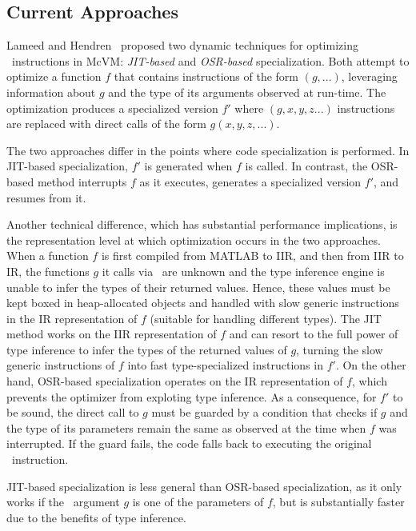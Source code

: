 
\subsection{Current Approaches}
\label{ss:prev-eval-sol}

Lameed and Hendren~\cite{lameed2013feval} proposed two dynamic techniques for optimizing \feval\ instructions in McVM: {\em JIT-based} and {\em OSR-based} specialization. Both attempt to optimize a function $f$ that contains instructions of the form \feval$(g,...)$, leveraging information about $g$ and the type of its arguments observed at run-time. The optimization produces a specialized version $f'$ where \feval$(g,x,y,z...)$ instructions are replaced with direct calls of the form $g(x,y,z,...)$. 

The two approaches differ in the points where code specialization is performed. In JIT-based specialization, $f'$ is generated when $f$ is called. In contrast, the OSR-based method interrupts $f$ as it executes, generates a specialized version $f'$, and resumes from it.  

Another technical difference, which has substantial performance implications, is the representation level at which optimization occurs in the two approaches. When a function $f$ is first compiled from MATLAB to IIR, and then from IIR to IR, the functions $g$ it calls via \feval\ are unknown and the type inference engine is unable to infer the types of their returned values. Hence, these values must be kept boxed in heap-allocated objects and handled with slow generic instructions in the IR representation of $f$ (suitable for handling different types). The JIT method works on the IIR representation of $f$ and can resort to the full power of type inference to infer the types of the returned values of $g$, turning the slow generic instructions of $f$ into fast type-specialized instructions in $f'$. On the other hand, OSR-based specialization operates on the IR representation of $f$, which prevents the optimizer from exploting type inference. As a consequence, for $f'$ to be sound, the direct call to $g$ must be guarded by a condition that checks if $g$ and the type of its parameters remain the same as observed at the time when $f$ was interrupted. If the guard fails, the code falls back to executing the original \feval\ instruction. 

JIT-based specialization is less general than OSR-based specialization, as it only works if the \feval\ argument $g$ is one of the parameters of $f$, but is substantially faster due to the benefits of type inference.

